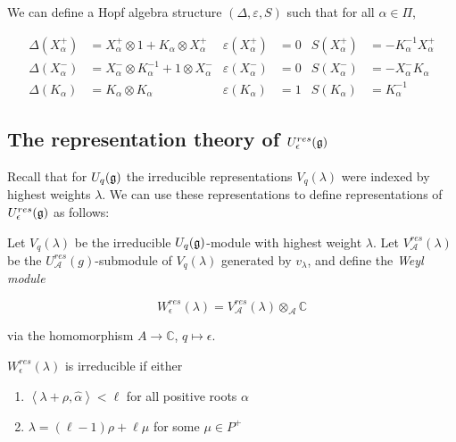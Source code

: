 We can define a Hopf algebra structure $(\Delta, \varepsilon, S)$ such
that for all $\alpha \in \Pi$,

    \begin{align}
        \Delta( X^+ _\alpha) &=  X^+ _\alpha \otimes 1 + K_\alpha \otimes  X^+ _\alpha      & \varepsilon( X^+ _\alpha) &= 0  & S( X^+ _\alpha) &= -K_\alpha^{-1}  X^+ _\alpha \\
        \Delta(X^-_\alpha) &= X^-_\alpha \otimes K_\alpha^{-1} + 1 \otimes X^-_\alpha & \varepsilon(X^-_\alpha) &= 0  & S(X^-_\alpha) &= -X^-_\alpha K_\alpha \\
        \Delta(K_\alpha) &= K_\alpha \otimes K_\alpha                           & \varepsilon(K_\alpha) &= 1  & S(K_\alpha) &= K_\alpha^{-1}
    \end{align}


\subsection{The representation theory of $U_\epsilon^{res}(\mathfrak{g})$}

Recall that for $U_q(\mathfrak{g})$ the irreducible representations $V_q(\lambda)$
were indexed by highest weights $\lambda$. We can use these representations to
define representations of $U_\epsilon^{res}(\mathfrak{g})$ as follows:


Let $V_q(\lambda)$ be the irreducible $U_q(\mathfrak{g})$-module with highest weight
$\lambda$. Let $V_\mathcal{A}^{res}(\lambda)$ be the
$U_\mathcal{A}^{res}(g)$-submodule of $V_q(\lambda)$ generated by $v_\lambda$,
and define the \emph{Weyl module}

\begin{equation}
    W_\epsilon^{res}(\lambda) = V_\mathcal{A}^{res}(\lambda) \otimes_\mathcal{A} \mathbb{C}
\end{equation}

via the homomorphism $A \to \mathbb{C}$, $q \mapsto \epsilon$.

\begin{claim}
    $W_\epsilon^{res}(\lambda)$ is irreducible if either 
    \begin{enumerate}
        \item $\left< \lambda + \rho, \hat{\alpha}\right> < \ell$ for all positive
            roots $\alpha$
        \item $\lambda = (\ell - 1) \rho + \ell \mu$ for some $\mu \in P^+$
    \end{enumerate}
\end{claim}

